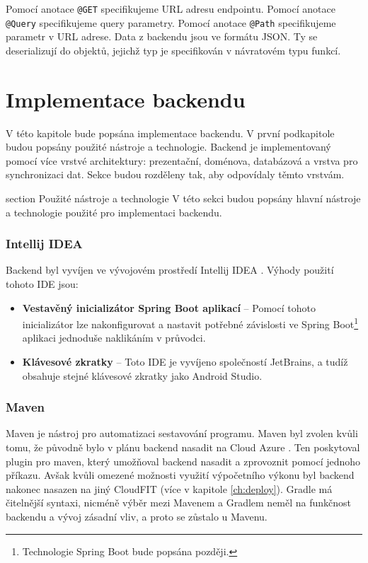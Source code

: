 \noindent Pomocí anotace \lstinline|@GET| specifikujeme URL adresu endpointu. Pomocí anotace \lstinline|@Query| specifikujeme query parametry. Pomocí anotace \lstinline|@Path| specifikujeme parametr v URL adrese. Data z backendu jsou ve formátu JSON. Ty se deserializují do objektů, jejichž typ je specifikován v návratovém typu funkcí.

\chapter{Implementace backendu}
V této kapitole bude popsána implementace backendu. V první podkapitole budou popsány použité nástroje a technologie. Backend je implementovaný pomocí více vrstvé \linebreak architektury: prezentační, doménova, databázová a vrstva pro synchronizaci dat. Sekce budou rozděleny tak, aby odpovídaly těmto vrstvám.

section {Použité nástroje a technologie}
V této sekci budou popsány hlavní nástroje a technologie použité pro implementaci backendu.

\subsection*{Intellij IDEA}
Backend byl vyvíjen ve vývojovém prostředí Intellij IDEA \cite{idea}. Výhody použití tohoto IDE jsou:
	
\begin{itemize}
	\item \textbf{Vestavěný inicializátor Spring Boot aplikací} -- Pomocí tohoto inicializátor lze nakonfigurovat a nastavit potřebné závislosti ve Spring Boot\footnote{Technologie Spring Boot bude popsána později.} aplikaci jednoduše naklikáním \linebreak v průvodci.
	
	\item \textbf{Klávesové zkratky} -- Toto IDE je vyvíjeno společností JetBrains, a tudíž obsahuje stejné klávesové zkratky jako Android Studio.
\end{itemize}

\subsection*{Maven}
Maven je nástroj pro automatizaci sestavování programu. Maven byl zvolen kvůli tomu, že původně bylo v plánu backend nasadit na Cloud Azure \cite{azure}. Ten poskytoval plugin pro maven, který umožňoval backend nasadit a zprovoznit pomocí jednoho příkazu. Avšak kvůli omezené možnosti využití výpočetního výkonu byl backend nakonec nasazen na jiný CloudFIT (více v kapitole \ref{ch:deploy}). Gradle má čitelnější syntaxi, nicméně výběr mezi Mavenem a Gradlem neměl na funkčnost backendu a vývoj zásadní vliv, a proto se zůstalo u Mavenu.

